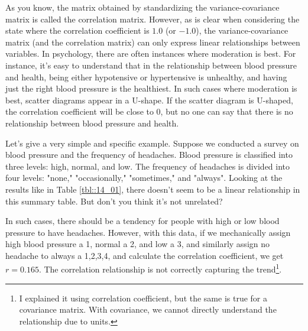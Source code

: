 \documentclass{ltjsbook}
\begin{document}
As you know, the matrix obtained by standardizing the variance-covariance matrix is called the correlation matrix. However, as is clear when considering the state where the correlation coefficient is $1.0$ (or $-1.0$), the variance-covariance matrix (and the correlation matrix) can only express linear relationships between variables. In psychology, there are often instances where moderation is best. For instance, it's easy to understand that in the relationship between blood pressure and health, being either hypotensive or hypertensive is unhealthy, and having just the right blood pressure is the healthiest. In such cases where moderation is best, scatter diagrams appear in a U-shape. If the scatter diagram is U-shaped, the correlation coefficient will be close to 0, but no one can say that there is no relationship between blood pressure and health.


Let's give a very simple and specific example. Suppose we conducted a survey on blood pressure and the frequency of headaches. Blood pressure is classified into three levels: high, normal, and low. The frequency of headaches is divided into four levels: "none," "occasionally," "sometimes," and "always". Looking at the results like in Table \ref{tbl::14_01}, there doesn't seem to be a linear relationship in this summary table. But don't you think it's not unrelated?



In such cases, there should be a tendency for people with high or low blood pressure to have headaches. However, with this data, if we mechanically assign high blood pressure a 1, normal a 2, and low a 3, and similarly assign no headache to always a 1,2,3,4, and calculate the correlation coefficient, we get $r=0.165$. The correlation relationship is not correctly capturing the trend\footnote{I explained it using correlation coefficient, but the same is true for a covariance matrix. With covariance, we cannot directly understand the relationship due to units.}.
\end{document}
